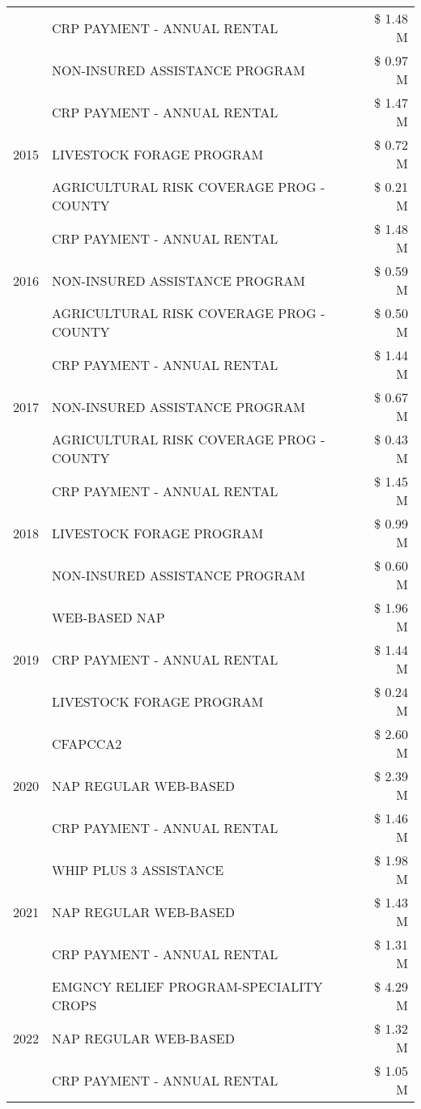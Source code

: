 \begin{tabular}{llr}
 & CRP PAYMENT - ANNUAL RENTAL & \$ 1.48 M \\
 & NON-INSURED ASSISTANCE PROGRAM & \$ 0.97 M \\
\cline{1-3}
\multirow[t]{3}{*}{2015} & CRP PAYMENT - ANNUAL RENTAL & \$ 1.47 M \\
 & LIVESTOCK FORAGE PROGRAM & \$ 0.72 M \\
 & AGRICULTURAL RISK COVERAGE PROG - COUNTY & \$ 0.21 M \\
\cline{1-3}
\multirow[t]{3}{*}{2016} & CRP PAYMENT - ANNUAL RENTAL & \$ 1.48 M \\
 & NON-INSURED ASSISTANCE PROGRAM & \$ 0.59 M \\
 & AGRICULTURAL RISK COVERAGE PROG - COUNTY & \$ 0.50 M \\
\cline{1-3}
\multirow[t]{3}{*}{2017} & CRP PAYMENT - ANNUAL RENTAL & \$ 1.44 M \\
 & NON-INSURED ASSISTANCE PROGRAM & \$ 0.67 M \\
 & AGRICULTURAL RISK COVERAGE PROG - COUNTY & \$ 0.43 M \\
\cline{1-3}
\multirow[t]{3}{*}{2018} & CRP PAYMENT - ANNUAL RENTAL & \$ 1.45 M \\
 & LIVESTOCK FORAGE PROGRAM & \$ 0.99 M \\
 & NON-INSURED ASSISTANCE PROGRAM & \$ 0.60 M \\
\cline{1-3}
\multirow[t]{3}{*}{2019} & WEB-BASED NAP & \$ 1.96 M \\
 & CRP PAYMENT - ANNUAL RENTAL & \$ 1.44 M \\
 & LIVESTOCK FORAGE PROGRAM & \$ 0.24 M \\
\cline{1-3}
\multirow[t]{3}{*}{2020} & CFAPCCA2 & \$ 2.60 M \\
 & NAP REGULAR WEB-BASED & \$ 2.39 M \\
 & CRP PAYMENT - ANNUAL RENTAL & \$ 1.46 M \\
\cline{1-3}
\multirow[t]{3}{*}{2021} & WHIP PLUS 3 ASSISTANCE & \$ 1.98 M \\
 & NAP REGULAR WEB-BASED & \$ 1.43 M \\
 & CRP PAYMENT - ANNUAL RENTAL & \$ 1.31 M \\
\cline{1-3}
\multirow[t]{3}{*}{2022} & EMGNCY RELIEF PROGRAM-SPECIALITY CROPS & \$ 4.29 M \\
 & NAP REGULAR WEB-BASED & \$ 1.32 M \\
 & CRP PAYMENT - ANNUAL RENTAL & \$ 1.05 M \\
\cline{1-3}
\bottomrule
\end{tabular}
